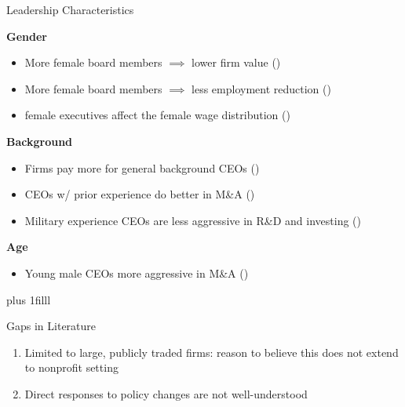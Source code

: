 \documentclass[notes,11pt, aspectratio=169]{beamer}
\newcommand{\btVFill}{\vskip0pt plus 1filll}
\begin{document}
\begin{frame}{Leadership Characteristics}

\vspace{1mm}

\textbf{Gender}
\begin{itemize}
    \item \small More female board members $\implies$ lower firm value \scriptsize(\cite{ahern2012changing}) \small
    \item \small More female board members $\implies$ less employment reduction \scriptsize (\cite{matsa2013female}) \small
    \item female executives affect the female wage distribution \scriptsize (\cite{flabbi2019female}) \small
\end{itemize}

\vspace{2mm}

\textbf{Background}
\begin{itemize}
    \item \small Firms pay more for general background CEOs \scriptsize (\cite{custodio2013generalists}) \small
    \item \small CEOs w/ prior experience do better in M\&A \scriptsize(\cite{custodio2013ceos}) \small
    \item \small Military experience CEOs are less aggressive in R\&D and investing \scriptsize (\cite{benmelech2015military})
\end{itemize}

\vspace{2mm}

\textbf{Age}
\begin{itemize}
    \item \small Young male CEOs more aggressive in M\&A \scriptsize (\cite{levi2010deal})
\end{itemize}

\btVFill\pause

\begin{block}{\normalsize Gaps in Literature}
    \small 
    \begin{enumerate}
        \item Limited to large, publicly traded firms: reason to believe this does not extend to nonprofit setting
        \item Direct responses to policy changes are not well-understood
    \end{enumerate}
\end{block}
\end{frame}
\end{document}

